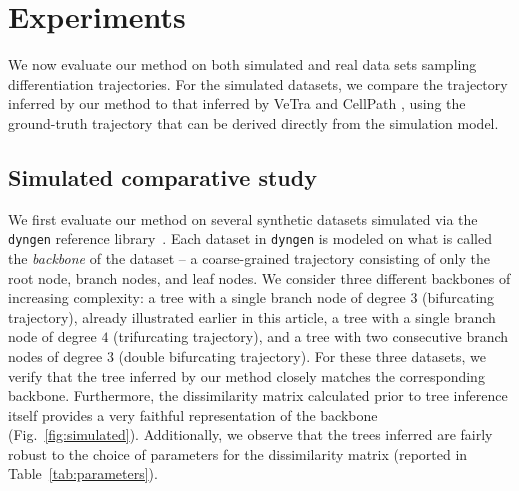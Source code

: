 \documentclass[pdflatex,sn-mathphys-num]{sn-jnl}%
\theoremstyle{thmstyleone}%
\theoremstyle{thmstyletwo}%
\theoremstyle{thmstylethree}%
\begin{document}
\section{Experiments}\label{sec:experiments}

We now evaluate our method on both simulated and real data sets sampling differentiation trajectories. For the simulated datasets, we compare the trajectory inferred by our method to that inferred by VeTra \cite{weng_vetra_2021} and CellPath \cite{zhang_cellpath_2021}, using the ground-truth trajectory that can be derived directly from the simulation model.

\subsection{Simulated comparative study}
We first evaluate our method on several synthetic datasets simulated via the \texttt{dyngen} reference library~\cite{robrecht_dyngen_2021}. Each dataset in \texttt{dyngen} is modeled on what is called the \textit{backbone} of the dataset -- a coarse-grained trajectory consisting of only the root node, branch nodes, and leaf nodes. We consider three different backbones of increasing complexity: a tree with a single branch node of degree $3$ (bifurcating trajectory), already illustrated earlier in this article, a tree with a single branch node of degree $4$ (trifurcating trajectory), and a tree with two consecutive branch nodes of degree $3$ (double bifurcating trajectory). For these three datasets, we verify that the tree inferred by our method closely matches the corresponding backbone. Furthermore, the dissimilarity matrix calculated prior to tree inference itself provides a very faithful representation of the backbone (Fig.~\ref{fig:simulated}). Additionally, we observe that the trees inferred are fairly robust to the choice of parameters for the dissimilarity matrix (reported in Table~\ref{tab:parameters}).
\end{document}
